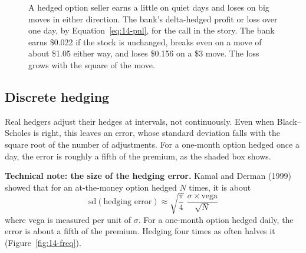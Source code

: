 \begin{figure}[htbp]
\centering
{}
\caption{A hedged option seller earns a little on quiet days and loses on big moves in either direction. The bank's delta-hedged profit or loss over one day, by Equation~\eqref{eq:14-pnl}, for the call in the story. The bank earns \$0.022 if the stock is unchanged, breaks even on a move of about \$1.05 either way, and loses \$0.156 on a \$3 move. The loss grows with the square of the move.}
\label{fig:14-pnl}
\end{figure}



\subsection{Discrete hedging}

Real hedgers adjust their hedges at intervals, not continuously. Even when Black--Scholes is right, this leaves an error, whose standard deviation falls with the square root of the number of adjustments. For a one-month option hedged once a day, the error is roughly a fifth of the premium, as the shaded box shows.

\begin{technote}
\textbf{Technical note: the size of the hedging error.} Kamal and Derman (1999) showed that for an at-the-money option hedged $N$ times, it is about
\begin{equation}
  \mathrm{sd}(\text{hedging error}) \approx \sqrt{\frac{\pi}{4}}\;\frac{\sigma \times \text{vega}}{\sqrt{N}}
  \label{eq:14-kd}
\end{equation}
where vega is measured per unit of $\sigma$. For a one-month option hedged daily, the error is about a fifth of the premium. Hedging four times as often halves it (Figure~\ref{fig:14-freq}).
\end{technote}

